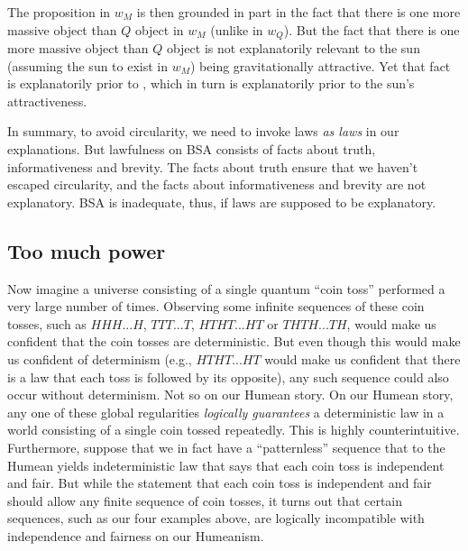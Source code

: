 The proposition  in $w_M$ is then grounded in part in the fact that there is one more massive object
than $Q$ object in $w_M$ (unlike in $w_Q$). But the fact that there is one more massive object than $Q$ object is 
not explanatorily relevant to the sun (assuming the sun to exist in $w_M$) being gravitationally attractive. 
Yet that fact is explanatorily prior to , which in turn is explanatorily prior to the sun's attractiveness.

In summary, to avoid circularity, we need to invoke laws \textit{as laws} in our explanations. But lawfulness on BSA consists
of facts about truth, informativeness and brevity. The facts about truth ensure that we haven't escaped circularity, and the
facts about informativeness and brevity are not explanatory. BSA is inadequate, thus, if laws are supposed to be explanatory.

\subsection{Too much power}
Now imagine a universe consisting of a single quantum ``coin toss'' performed a very large number of times. Observing some 
infinite sequences of these coin tosses, such as $HHH...H$, $TTT...T$, $HTHT...HT$ or $THTH...TH$, would make us confident 
that the coin tosses are deterministic. But even though this would make us confident of determinism (e.g., $HTHT...HT$
would make us confident that there is a law that each toss is followed by its opposite), any such sequence could also
occur without determinism. Not so on our Humean story. On our Humean story, any one of these global regularities \textit{logically 
guarantees} a deterministic law in a world consisting of a single coin tossed repeatedly. This is highly counterintuitive. 
Furthermore, suppose that we in fact have a ``patternless'' sequence that to the Humean yields indeterministic law that says 
that each coin toss is independent and fair. But while the statement that each coin toss is independent and fair should allow any 
finite sequence of coin tosses, it turns out that certain sequences, such as our four examples above, are logically incompatible with 
independence and fairness on our Humeanism.

